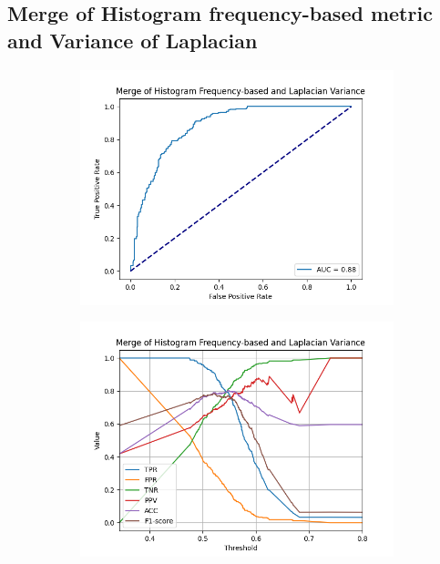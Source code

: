 \subsection{Merge of Histogram frequency-based metric and Variance of Laplacian}
\begin{figure}[H]
    \centering
    \begin{subfigure}[t]{0.48\textwidth}
        \includegraphics[width=\textwidth]{Figures/results_on_thresholds/output_roc_hf_lv.png}
        \caption{}
        \label{fig:HF_LV_roc}
    \end{subfigure}\hspace{1em}
    \begin{subfigure}[t]{0.48\textwidth}
        \includegraphics[width=\textwidth]{Figures/results_on_thresholds/threshold_test_scores_hf_lv.png}

\end{subfigure}
\end{figure}
